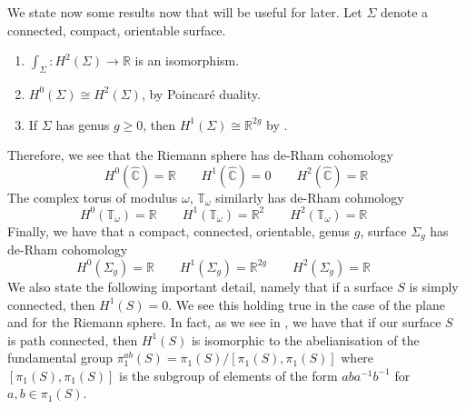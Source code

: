 \documentclass[11pt]{report}
\theoremstyle{definition}
\begin{document}
We state now some results now that will be useful for later. Let $\Sigma$ denote a connected, compact, orientable surface.
\begin{enumerate}
  \item $\int_{\Sigma} :H^2(\Sigma) \rightarrow \mathbb{R}$ is an isomorphism. \cite[(p.91, Corollary 10.14)]{calcohomo}
  \item $H^0(\Sigma)\cong H^2(\Sigma)$, by Poincar\'{e} duality.
  \item If $\Sigma$ has genus $g \geq 0$, then $H^1(\Sigma) \cong \mathbb{R}^{2g}$ by \cite[p.69]{donaldson}.
\end{enumerate}
Therefore, we see that the Riemann sphere has de-Rham cohomology
\[
  H^0(\widehat{\mathbb{C}}) = \mathbb{R} \qquad 
  H^1(\widehat{\mathbb{C}}) = 0 \qquad 
  H^2(\widehat{\mathbb{C}}) = \mathbb{R}
\]
 The complex torus of modulus $\omega$, $\mathbb{T_\omega}$ similarly has de-Rham cohmology
\[
   H^0(\mathbb{T_\omega}) = \mathbb{R} \qquad
   H^1(\mathbb{T_\omega}) = \mathbb{R}^2 \qquad
   H^2(\mathbb{T_\omega}) = \mathbb{R} \qquad
\]
Finally, we have that a compact, connected, orientable, genus $g$, surface $\Sigma_g$ has de-Rham cohomology
\[
   H^0(\Sigma_g) = \mathbb{R} \qquad
   H^1(\Sigma_g) = \mathbb{R}^{2g} \qquad
   H^2(\Sigma_g) = \mathbb{R} \qquad
\]
We also state the following important detail, namely that if a surface $S$ is simply connected, then $H^1(S) = 0$. We see this holding true in the case of the plane and for the Riemann sphere. In fact, as we see in \cite[(p.166, Theorem 2A.1)]{Hatchers}, we have that if our surface $S$ is path connected, then $H^1(S)$ is isomorphic to the abelianisation of the fundamental group $\pi_1^{ab}(S) = \pi_1(S)/[\pi_1(S),\pi_1(S)]$ where $[\pi_1(S),\pi_1(S)]$ is the subgroup of elements of the form $aba^{-1}b^{-1}$ for $a,b \in \pi_1(S)$. 
\end{document}
